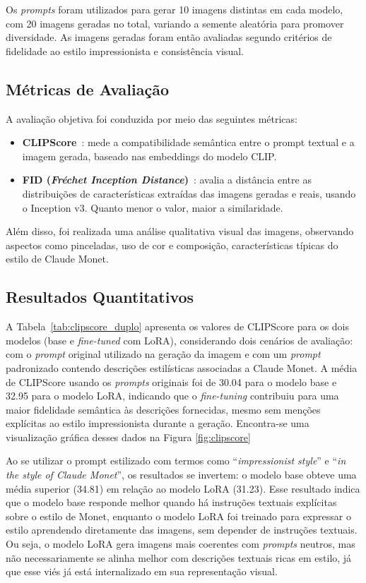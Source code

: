 Os \textit{prompts} foram utilizados para gerar 10 imagens distintas em cada modelo, com 20 imagens geradas no total, variando a semente aleatória para promover diversidade. As imagens geradas foram então avaliadas segundo critérios de fidelidade ao estilo impressionista e consistência visual.

\subsection{Métricas de Avaliação}

A avaliação objetiva foi conduzida por meio das seguintes métricas:

\begin{itemize}
    \item \textbf{CLIPScore}~\cite{clipscore}: mede a compatibilidade semântica entre o prompt textual e a imagem gerada, baseado nas embeddings do modelo CLIP.
    \item \textbf{FID (\textit{Fréchet Inception Distance})}~\cite{fid}: avalia a distância entre as distribuições de características extraídas das imagens geradas e reais, usando o Inception v3. Quanto menor o valor, maior a similaridade.
\end{itemize}

Além disso, foi realizada uma análise qualitativa visual das imagens, observando aspectos como pinceladas, uso de cor e composição, características típicas do estilo de Claude Monet.

\subsection{Resultados Quantitativos}

A Tabela~\ref{tab:clipscore_duplo} apresenta os valores de CLIPScore para os dois modelos (base e \textit{fine-tuned} com LoRA), considerando dois cenários de avaliação: com o \textit{prompt} original utilizado na geração da imagem e com um \textit{prompt} padronizado contendo descrições estilísticas associadas a Claude Monet. A média de CLIPScore usando os \textit{prompts} originais foi de 30.04 para o modelo base e 32.95 para o modelo LoRA, indicando que o \textit{fine-tuning} contribuiu para uma maior fidelidade semântica às descrições fornecidas, mesmo sem menções explícitas ao estilo impressionista durante a geração. Encontra-se uma visualização gráfica desses dados na Figura \ref{fig:clipscore}

Ao se utilizar o prompt estilizado com termos como ``\textit{impressionist style}'' e ``\textit{in the style of Claude Monet}'', os resultados se invertem: o modelo base obteve uma média superior (34.81) em relação ao modelo LoRA (31.23). Esse resultado indica que o modelo base responde melhor quando há instruções textuais explícitas sobre o estilo de Monet, enquanto o modelo LoRA foi treinado para expressar o estilo aprendendo diretamente das imagens, sem depender de instruções textuais. Ou seja, o modelo LoRA gera imagens mais coerentes com \textit{prompts} neutros, mas não necessariamente se alinha melhor com descrições textuais ricas em estilo, já que esse viés já está internalizado em sua representação visual.

